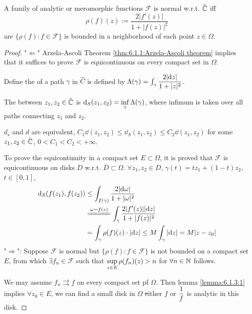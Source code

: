\begin{theorem}\label{thm:6.1.3:Marty's Theorem}
    A family of analytic or meromorphic functions $ \mathscr{F } $ is normal w.r.t.  $ \hat{\mathbb C } $ iff 
    \begin{equation}
        \rho(f)(z):=\frac{2|f'(z)|}{1+|f(z)|^2}
    \end{equation}
    are  \ie  $ \{\rho(f):f\in \mathscr{F}\} $ is bounded in a neighborhood of each point  $ z\in \Omega  $. 
\end{theorem}
\begin{proof}
    "$ \Leftarrow $" Arzela-Ascoli Theorem  \ref{thm:6.1.1:Arzela-Ascoli theorem} implies that it suffices to prove  $ \mathscr{F } $ is equicontinuous on every compact set in  $ \Omega $.
    
    Define the  of a path  $ \gamma  $ in  $ \hat{C} $ is defined by  $ \Lambda(\gamma)=\int_\gamma\displaystyle\frac{2|\mathrm{d} z|}{1+|z|^2} $.
    
    The  between  $ z_1,z_2\in \hat{\mathbb C} $ is  $ \mathrm{d}_S(z_1,z_2)=\displaystyle\inf_{\gamma}\Lambda(\gamma) $,
    where infimum is taken over all paths connecting  $ z_1 $ and  $ z_2 $.
    
    $ d_s  $ and  $ d  $ are equivalent, \ie $ C_1\dd(z_1,z_2) \leq \dd_S(z_1,z_2) \leq C_2\dd(z_1,z_2) $ for some  $ z_1,z_2\in \hat{\mathbb C} $,  $ 0<C_1<C_2<+\infty $.
    
    To prove the equicontinuity in a compact set  $ E\subset \Omega $, it is proved that  $ \mathscr{F} $ is equicontinuous   on disks  $ D $ w.r.t.  $ \overline{D}\subset \Omega $.  $ \forall z_1,z_2\in D $,  $ \gamma(t)=tz_1+ (1-t)z_2 $,  $ t\in [0,1] $, 
    \[\begin{aligned}
        \dd_S(f(z_1),f(z_2))& \leq \int_{f(\gamma)}\frac{2|\dd\omega|}{1+|\omega|^2}\\
        &\xlongequal{\omega=f(z)}\int_{\gamma}\frac{2|f'(z)||\dd z|}{1+|f(z)|^2}\\
        &=\int_\gamma \rho(f)(z)\cdot|\dd z| \leq M\int_\gamma |\dd z|=M|z-z_0|
    \end{aligned}\]     
    "$ \Rightarrow $": Suppose  $ \mathscr{F} $ is normal but  $ \{\rho(f):f\in \mathscr{F}\} $ is not bounded on a compact set  $ E $, from  which $ \exists f_n\in \mathscr{F} $ such that  $ \displaystyle\sup_{z\in E}\rho(f_n)(z)>n $ for  $ \forall n\in \mathbb N $ follows.
    
    We may assume  $ f_n\rightrightarrows f $ on every compact set pf  $ \Omega $. Then lemma \ref{lemma:6.1.3:1} implies  $ \forall z_0\in E $, we can find a small disk in  $ \Omega $ \st either  $ f $ or  $ \displaystyle\frac{1}{f} $ is analytic in this disk.
    

\end{proof}
